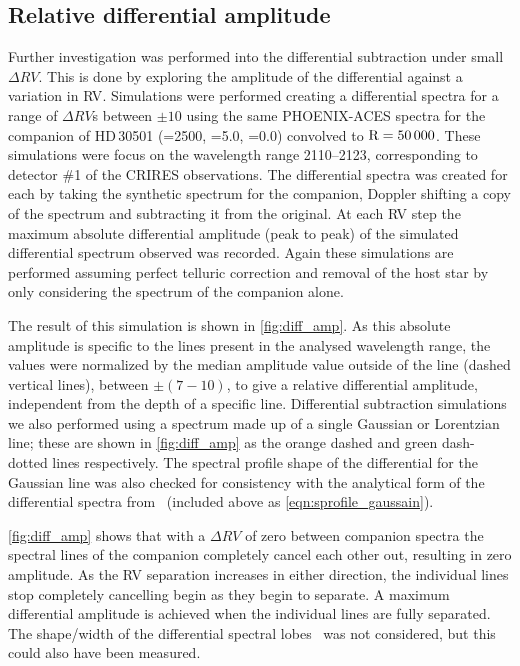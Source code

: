 

\subsection{Relative differential amplitude}
\label{subsec:relative_differential_amplitue}
Further investigation was performed into the differential subtraction under small \(\Delta {RV}\).
This is done by exploring the amplitude of the differential against a variation in {RV}.
Simulations were performed creating a differential spectra for a range of \(\Delta {RV}\)s between \(\pm10\)\kmps{} using the same {PHOENIX-ACES} spectra for the companion of {HD\,30501} (\Teff{}=2500\K{}, \Logg{}=5.0, \feh{}=0.0) convolved to \(\textrm{R}=50\,000\).
These simulations were focus on the wavelength range 2110--2123\nm{}, corresponding to detector \#1 of the {CRIRES} observations.
The differential spectra was created for each by taking the synthetic spectrum for the companion, Doppler shifting a copy of the spectrum and subtracting it from the original.
At each {RV} step the maximum absolute differential amplitude (peak to peak) of the simulated differential spectrum observed was recorded.
Again these simulations are performed assuming perfect telluric correction and removal of the host star by only considering the spectrum of the companion alone.

The result of this simulation is shown in \cref{fig:diff_amp}.
As this absolute amplitude is specific to the lines present in the analysed wavelength range, the values were normalized by the median amplitude value outside of the line {\fwhm} (dashed vertical lines), between \(\pm(7-10)\)\kmps{}, to give a relative differential amplitude, independent from the depth of a specific line.
Differential subtraction simulations we also performed using a spectrum made up of a single Gaussian or Lorentzian line; these are shown in \cref{fig:diff_amp} as the orange dashed and green dash-dotted lines respectively.
The spectral profile shape of the differential for the Gaussian line was also checked for consistency with the analytical form of the differential spectra from~\citet[][Equation~A.1]{ferluga_separating_1997} (included above as \cref{eqn:sprofile_gaussain}).

\cref{fig:diff_amp} shows that with a \(\Delta {RV}\) of zero between companion spectra the spectral lines of the companion completely cancel each other out, resulting in zero amplitude.
As the {RV} separation increases in either direction, the individual lines stop completely cancelling begin as they begin to separate.
A maximum differential amplitude is achieved when the individual lines are fully separated.
The shape/width of the differential spectral lobes~\citet[e.g.][eqn.~A.1]{ferluga_separating_1997} was not considered, but this could also have been measured.

